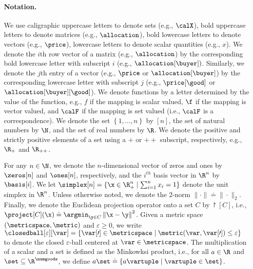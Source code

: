 \paragraph{Notation.} We use caligraphic uppercase letters to denote sets (e.g., $\calX$), bold uppercase letters to denote matrices (e.g., $\allocation$), bold lowercase letters to denote vectors (e.g., $\price$), lowercase letters to denote scalar quantities (e.g., $x$). 
We denote the $i$th row vector of a matrix (e.g., $\allocation$) by the corresponding bold lowercase letter with subscript $i$ (e.g., $\allocation[\buyer])$. 
Similarly, we denote the $j$th entry of a vector (e.g., $\price$ or $\allocation[\buyer]$) by the corresponding lowercase letter with subscript $j$ (e.g., $\price[\good]$ or $\allocation[\buyer][\good]$).
We denote functions by a letter determined by the value of the function, e.g., $f$ if the mapping is scalar valued, $\f$ if the mapping is vector valued, and $\calF$ if the mapping is set valued (i.e., $\calF$ is a correspondence).
We denote the set $\left\{1, \hdots, n\right\}$ by $[n]$, the set of natural numbers by $\N$, and the set of real numbers by $\R$. 
We denote the positive and strictly positive elements of a set using a $+$ or $++$ subscript, respectively, e.g., $\R_+$ and $\R_{++}$. 

For any $n \in \N$, we denote the  $n$-dimensional vector of zeros and ones by $\zeros[n]$ and $\ones[n]$, respectively, and the $i^{th}$ basis vector in $\R^n$ by $\basis[i]$.
We let $\simplex[n] = \{\x \in \R_+^n \mid \sum_{i = 1}^n x_i = 1 \}$ denote the unit simplex in $\R^n$.
Unless otherwise noted, we denote the 2-norm $\| \cdot \| \doteq \| \cdot \|_2$.
Finally, we denote the Euclidean projection operator onto a set $C$ by $\project[C]$, i.e., $\project[C](\x) \doteq \argmin_{\y \in C} \left\|\x - \y \right\|^2$. Given a metric space $(\metricspace, \metric)$ and $\varepsilon \geq 0$, we write $\closedball[\varepsilon][\var] = \{ \var[\prime] \in \metricspace \mid \metric(\var, \var[\prime]) \leq \varepsilon \}$ to denote the closed $\varepsilon$-ball centered at $\var \in \metricspace$.
The multiplication of a scalar and a set is defined as the Minkowksi product, i.e., for all $a \in \R$ and $\set \subseteq \R^\numgoods$, we define $a \set \doteq \{a \vartuple \mid \vartuple \in \set \}$.
